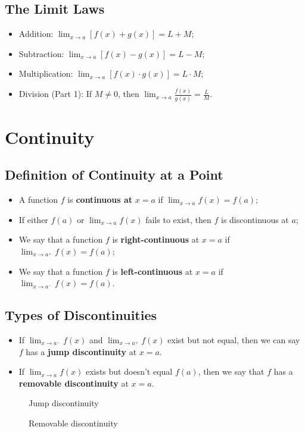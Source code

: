 \subsection{The Limit Laws}
\begin{itemize}
  \item Addition: $\lim_{x\to a}[f(x)+g(x)]=L+M$;
  \item Subtraction: $\lim_{x\to a}[f(x)-g(x)]=L-M$;
  \item Multiplication: $\lim_{x\to a}[f(x)\cdot g(x)]=L\cdot M$;
  \item Division (Part 1): If $M\neq 0$, then $\lim_{x\to a}\frac{f(x)}{g(x)}=\frac L M$.
\end{itemize}

\section{Continuity}
\subsection{Definition of Continuity at a Point}
\begin{itemize}
  \item A function $f$ is \textbf{continuous at} $x=a$ if $\lim_{x\to a}f(x)=f(a)$;
  \item If either $f(a)$ or $\lim_{x\to a} f(x)$ fails to exist, then $f$ is discontinuous at $a$;
  \item We say that a function $f$ is \textbf{right-continuous} at $x=a$ if $\lim_{x\to a^+}f(x)=f(a)$;
  \item We say that a function $f$ is \textbf{left-continuous} at $x=a$ if $\lim_{x\to a^-}f(x)=f(a)$.
\end{itemize}

\subsection{Types of Discontinuities}
\begin{itemize}
  \item If $\lim_{x\to a^-}f(x)$ and $\lim_{x\to a^+}f(x)$ exist but not equal, then we can say $f$ has a \textbf{jump discontinuity} at $x=a$.
  \item If $\lim_{x\to a}f(x)$ exists but doesn't equal $f(a)$, then we say that $f$ has a \textbf{removable discontinuity} at $x=a$.
\end{itemize}
\begin{figure}[H]\centering{}\caption{Jump discontinuity}\end{figure}
\begin{figure}[H]\centering{}\caption{Removable discontinuity}\end{figure}

